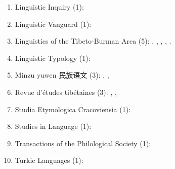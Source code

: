 \documentclass[oneside,a4paper,11pt]{article}
\newcommand{\zh}[1]{{\cn #1}}
\begin{document}
\begin{enumerate}
 \item Linguistic Inquiry (1): \citet{antonov14need}
 \item Linguistic Vanguard (1): \citet{jacques16th}
 \item Linguistics of the Tibeto-Burman Area (5): \citet{jacques09wazur}, \citet{jacques13tropative}, \citet{jacques14linking}, \citet{jacques15spontaneous}, \citet{jacques16si}.
 \item Linguistic Typology (1): \citet{jacques13harmonization}
 \item Minzu yuwen \zh{民族语文} (3): \citet{jacques03s.houzhui}, \citet{jacques04redupl}, \citet{jacques08weiyu}
 \item Revue d'études tibétaines (3): \citet{jacques07naksatram},  \citet{jacques08debther},   \citet{jacques10ndr}
 \item Studia Etymologica Cracoviensia (1):  \citet{jacques13vama}
  \item Studies in Language (1): \citet{jacques14auditory}
  \item Transactions of the Philological Society (1):  \citet{jacques12internal}
  \item Turkic Languages (1): \citet{antonov12kumush}
 \end{enumerate} 
 
\end{document}
